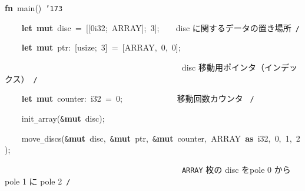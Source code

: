 \documentclass[a4paper,10pt]{article}
\def\mc{\relax}
\begin{document}
\noindent
\mbox{}\hfill

\noindent
\mbox{}\textbf{fn}{\tt\mc \ }main(){\tt\mc \ }{\tt\char'173}

\noindent
\mbox{}{\tt\mc \ }{\tt\mc \ }{\tt\mc \ }{\tt\mc \ }\textbf{let}{\tt\mc \ }\textbf{mut}{\tt\mc \ }disc{\tt\mc \ }={\tt\mc \ }[[0i32;{\tt\mc \ }ARRAY];{\tt\mc \ }3];{\tt\mc \ }{\tt\mc \ }\rm\mc {\tt /}{\tt *}\  \ disc に関するデータの置き場所\hfill \rm\mc \ {\tt *}{\tt /}
\tt\mc 

\noindent
\mbox{}{\tt\mc \ }{\tt\mc \ }{\tt\mc \ }{\tt\mc \ }\textbf{let}{\tt\mc \ }\textbf{mut}{\tt\mc \ }ptr:{\tt\mc \ }[usize;{\tt\mc \ }3]{\tt\mc \ }={\tt\mc \ }[ARRAY,{\tt\mc \ }0,{\tt\mc \ }0];

\noindent
\mbox{}{\tt\mc \ }{\tt\mc \ }{\tt\mc \ }{\tt\mc \ }{\tt\mc \ }{\tt\mc \ }{\tt\mc \ }{\tt\mc \ }{\tt\mc \ }{\tt\mc \ }{\tt\mc \ }{\tt\mc \ }{\tt\mc \ }{\tt\mc \ }{\tt\mc \ }{\tt\mc \ }{\tt\mc \ }{\tt\mc \ }{\tt\mc \ }{\tt\mc \ }{\tt\mc \ }{\tt\mc \ }{\tt\mc \ }{\tt\mc \ }{\tt\mc \ }{\tt\mc \ }{\tt\mc \ }{\tt\mc \ }{\tt\mc \ }{\tt\mc \ }{\tt\mc \ }{\tt\mc \ }{\tt\mc \ }{\tt\mc \ }{\tt\mc \ }{\tt\mc \ }{\tt\mc \ }{\tt\mc \ }{\tt\mc \ }{\tt\mc \ }\rm\mc {\tt /}{\tt *}\  \ disc 移動用ポインタ（インデックス）\hfill \rm\mc \ {\tt *}{\tt /}
\tt\mc 

\noindent
\mbox{}{\tt\mc \ }{\tt\mc \ }{\tt\mc \ }{\tt\mc \ }\textbf{let}{\tt\mc \ }\textbf{mut}{\tt\mc \ }counter:{\tt\mc \ }i32{\tt\mc \ }={\tt\mc \ }0;{\tt\mc \ }{\tt\mc \ }{\tt\mc \ }{\tt\mc \ }{\tt\mc \ }{\tt\mc \ }{\tt\mc \ }{\tt\mc \ }{\tt\mc \ }{\tt\mc \ }{\tt\mc \ }\rm\mc {\tt /}{\tt *}\  \ 移動回数カウンタ \hfill \rm\mc \ {\tt *}{\tt /}
\tt\mc 

\noindent
\mbox{}\hfill

\noindent
\mbox{}{\tt\mc \ }{\tt\mc \ }{\tt\mc \ }{\tt\mc \ }init{\tt\_}array({\tt\&}\textbf{mut}{\tt\mc \ }disc);

\noindent
\mbox{}{\tt\mc \ }{\tt\mc \ }{\tt\mc \ }{\tt\mc \ }move{\tt\_}discs({\tt\&}\textbf{mut}{\tt\mc \ }disc,{\tt\mc \ }{\tt\&}\textbf{mut}{\tt\mc \ }ptr,{\tt\mc \ }{\tt\&}\textbf{mut}{\tt\mc \ }counter,{\tt\mc \ }ARRAY{\tt\mc \ }\textbf{as}{\tt\mc \ }i32,{\tt\mc \ }0,{\tt\mc \ }1,{\tt\mc \ }2);

\noindent
\mbox{}{\tt\mc \ }{\tt\mc \ }{\tt\mc \ }{\tt\mc \ }{\tt\mc \ }{\tt\mc \ }{\tt\mc \ }{\tt\mc \ }{\tt\mc \ }{\tt\mc \ }{\tt\mc \ }{\tt\mc \ }{\tt\mc \ }{\tt\mc \ }{\tt\mc \ }{\tt\mc \ }{\tt\mc \ }{\tt\mc \ }{\tt\mc \ }{\tt\mc \ }{\tt\mc \ }{\tt\mc \ }{\tt\mc \ }{\tt\mc \ }{\tt\mc \ }{\tt\mc \ }{\tt\mc \ }{\tt\mc \ }{\tt\mc \ }{\tt\mc \ }{\tt\mc \ }{\tt\mc \ }{\tt\mc \ }{\tt\mc \ }{\tt\mc \ }{\tt\mc \ }{\tt\mc \ }{\tt\mc \ }{\tt\mc \ }{\tt\mc \ }\rm\mc {\tt /}{\tt *}\  \ {\tt ARRAY} 枚の disc をpole 0 から pole 1 に pole 2\hfill \rm\mc \ {\tt *}{\tt /}
\tt\mc 
\end{document}
